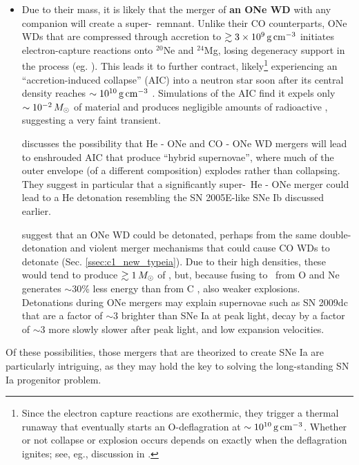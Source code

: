 \begin{itemize}
	\item Due to their mass, it is likely that the merger of {\bf an ONe WD} with any companion will create a super-\Mch\ remnant.  Unlike their CO counterparts, ONe WDs that are compressed through accretion to $\gtrsim3\times10^9\,\gcc$ initiates electron-capture reactions onto $^{20}$Ne and $^{24}$Mg, losing degeneracy support in the process (eg. \citealt{miya+80, saion85, schwqb15}).  This leads it to further contract, likely\footnote{Since the electron capture reactions are exothermic, they trigger a thermal runaway that eventually starts an O-deflagration at $\sim10^{10}\,\gcc$.  Whether or not collapse or explosion occurs depends on exactly when the deflagration ignites; see, eg., discussion in \cite{schwqb15}.} experiencing an ``accretion-induced collapse'' (AIC) into a neutron star soon after its central density reaches $\sim10^{10}\,\gcc$ \citep{schwqb15}.  Simulations \citep{dess+06, dess+07, frye+09} of the AIC find it expels only $\sim10^{-2}\,\Msun$ of material and produces negligible amounts of radioactive \Ni, suggesting a very faint transient.


\cite{dan+14} discusses the possibility that He - ONe and CO - ONe WD mergers will lead to enshrouded AIC that produce ``hybrid supernovae'', where much of the outer envelope (of a different composition) explodes rather than collapsing.  They suggest in particular that a significantly super-\Mch\ He - ONe merger could lead to a He detonation resembling the SN 2005E-like SNe Ib discussed earlier.

\cite{marq+15} suggest that an ONe WD could be detonated, perhaps from the same double-detonation and violent merger mechanisms that could cause CO WDs to detonate (Sec. \ref{ssec:c1_new_typeia}).  Due to their high densities, these would tend to produce $\gtrsim1\,\Msun$ of \Ni, but, because fusing to \Ni\ from O and Ne generates $\sim30$\% less energy than from C \citep{marq+15}, also weaker explosions.  Detonations during ONe mergers may explain supernovae such as SN 2009dc \citep{taub+09} that are a factor of $\sim3$ brighter than SNe Ia at peak light, decay by a factor of $\sim3$ more slowly slower after peak light, and low expansion velocities.

\end{itemize}

Of these possibilities, those mergers that are theorized to create SNe Ia are particularly intriguing, as they may hold the key to solving the long-standing SN Ia progenitor problem.
